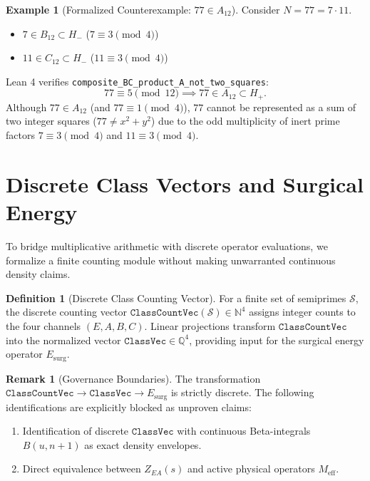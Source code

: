 \documentclass[11pt,a4paper]{article}
\theoremstyle{definition}
\newtheorem{definition}[theorem]{Definition}
\newtheorem{example}[theorem]{Example}
\newtheorem{remark}[theorem]{Remark}
\begin{document}
	\begin{example}[Formalized Counterexample: $77 \in A_{12}$]
		Consider $N = 77 = 7 \cdot 11$.
		\begin{itemize}
			\item $7 \in B_{12} \subset H_-$ ($7 \equiv 3 \pmod 4$)
			\item $11 \in C_{12} \subset H_-$ ($11 \equiv 3 \pmod 4$)
		\end{itemize}
		Lean 4 verifies \texttt{composite\_BC\_product\_A\_not\_two\_squares}:
		\[
		77 \equiv 5 \pmod{12} \implies 77 \in A_{12} \subset H_+.
		\]
		Although $77 \in A_{12}$ (and $77 \equiv 1 \pmod 4$), $77$ cannot be represented as a sum of two integer squares ($77 \neq x^2 + y^2$) due to the odd multiplicity of inert prime factors $7 \equiv 3 \pmod 4$ and $11 \equiv 3 \pmod 4$.
	\end{example}
	
	\section{Discrete Class Vectors and Surgical Energy}
	
	To bridge multiplicative arithmetic with discrete operator evaluations, we formalize a finite counting module without making unwarranted continuous density claims.
	
	\begin{definition}[Discrete Class Counting Vector]
		For a finite set of semiprimes $\mathcal{S}$, the discrete counting vector $\mathtt{ClassCountVec}(\mathcal{S}) \in \mathbb{N}^4$ assigns integer counts to the four channels $(E, A, B, C)$. Linear projections transform $\mathtt{ClassCountVec}$ into the normalized vector $\mathtt{ClassVec} \in \mathbb{Q}^4$, providing input for the surgical energy operator $E_{\mathrm{surg}}$.
	\end{definition}
	
	\begin{remark}[Governance Boundaries]
		The transformation $\mathtt{ClassCountVec} \to \mathtt{ClassVec} \to E_{\mathrm{surg}}$ is strictly discrete. The following identifications are explicitly blocked as unproven claims:
		\begin{enumerate}
			\item Identification of discrete $\mathtt{ClassVec}$ with continuous Beta-integrals $B(u, n+1)$ as exact density envelopes.
			\item Direct equivalence between $Z_{EA}(s)$ and active physical operators $M_{\mathrm{eff}}$.
		\end{enumerate}
	\end{remark}
	
\end{document}
